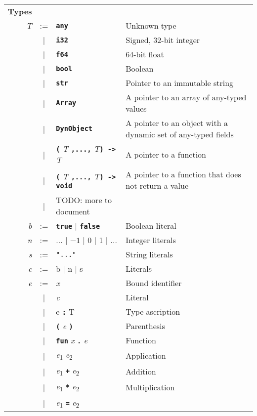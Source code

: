 \documentclass{article}
\newcommand{\kw}[1]{\textbf{\texttt{#1}}}
\newcommand{\metavar}[1]{\textit{#1}}
\begin{document}
\begin{tabular}{rcll}
\textbf{Types} \\
\metavar{T} & := & \kw{any} & Unknown type \\
    & |  & \kw{i32} & Signed, 32-bit integer \\
    & |  & \kw{f64} & 64-bit float \\
    & |  & \kw{bool} & Boolean \\
    & |  & \kw{str} & Pointer to an immutable string \\
    & |  & \kw{Array} & A pointer to an array of any-typed values \\
    & |  & \kw{DynObject} & A pointer to an object with a dynamic set of any-typed fields \\
    & |  & \kw{(} \metavar{T} \kw{,...,} \metavar{T}\kw{) ->} \metavar{T}
         & A pointer to a function \\
    & |  & \kw{(} \metavar{T} \kw{,...,} \metavar{T}\kw{) -> void} 
         & A pointer to a function that does not return a value \\
    & |  & TODO: more to document \\
\metavar{b} & := & \kw{true} | \kw{false} & Boolean literal \\
\metavar{n} & := & ... | $-1$ | 0 | 1 | ... & Integer literals \\
\metavar{s} & := & \texttt{"..."} & String literals \\
\metavar{c} & := & b | n | s & Literals \\
\metavar{e} & := & \textit{x}  & Bound identifier \\
            & |  & \metavar{c} & Literal \\
            & |  & e \kw{:} T  & Type ascription \\
            & |  & \kw{(} \metavar{e} \kw{)} & Parenthesis \\
            & |  & \kw{fun} \metavar{x} \kw{.} \metavar{e} & Function \\
            & |  & \metavar{e}\textsubscript{1} \metavar{e}\textsubscript{2}
                    & Application \\
            & |  & \metavar{e}\textsubscript{1} \kw{+} \metavar{e}\textsubscript{2}
                    & Addition \\
            & |  & \metavar{e}\textsubscript{1} \kw{*} \metavar{e}\textsubscript{2}
                    & Multiplication \\
            & |  & \metavar{e}\textsubscript{1} \kw{=} \metavar{e}\textsubscript{2}

\end{tabular}
\end{document}
